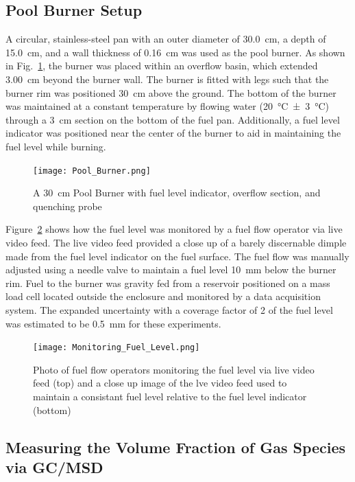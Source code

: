 \documentclass[12pt]{article}
\begin{document}
\subsection{Pool Burner Setup}
\label{ssec:Pool_Burner_Setup}
A circular, stainless-steel pan with an outer diameter of 30.0~\si{cm}, a depth of 15.0~\si{cm}, and a wall thickness of 0.16~\si{cm} was used as the pool burner. As shown in Fig.~\ref{fig:Pool Burner}, the burner was placed within an overflow basin, which extended 3.00~\si{cm} beyond the burner wall. The burner is fitted with legs such that the burner rim was positioned 30~\si{cm} above the ground. The bottom of the burner was maintained at a constant temperature by flowing water (20~°\si{C}~±~3~°\si{C}) through a 3~\si{cm} section on the bottom of the fuel pan. Additionally, a fuel level indicator was positioned near the center of the burner to aid in maintaining the fuel level while burning.

\begin{figure}[h!]
	\centering
\texttt{[image: Pool\_Burner.png]}
	\caption[Pool Burner Design]{A 30~\si{cm} Pool Burner with fuel level indicator, overflow section, and quenching probe}
	\label{fig:Pool Burner}
\end{figure}

Figure~\ref{fig:Fuel_Level} shows how the fuel level was monitored by a fuel flow operator via live video feed. The live video feed provided a close up of a barely discernable dimple made from the fuel level indicator on the fuel surface. The fuel flow was manually adjusted using a needle valve to maintain a fuel level 10~\si{mm} below the burner rim. Fuel to the burner was gravity fed from a reservoir positioned on a mass load cell located outside the enclosure and monitored by a data acquisition system. The expanded uncertainty with a coverage factor of 2 of the fuel level was estimated to be 0.5~\si{mm} for these experiments.

\begin{figure}[h!]
	\centering
\texttt{[image: Monitoring\_Fuel\_Level.png]}
	\caption[Monitoring Fuel Level]{Photo of fuel flow operators monitoring the fuel level via live video feed (top) and a close up image of the lve video feed used to maintain a consistant fuel level relative to the fuel level indicator (bottom)}
	\label{fig:Fuel_Level}
\end{figure}

\subsection{Measuring the Volume Fraction of Gas Species via GC/MSD}
\label{ssec:Gas_Species_Setup}
\end{document}
